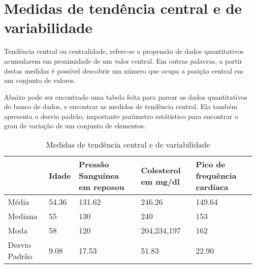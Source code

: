 \chapter{Medidas de tendência central e de variabilidade}

    Tendência central ou centralidade, refere-se a propensão de dados quantitativos acumularem
    em proximidade de um valor central. Em outras palavras, a partir destas medidas é possível 
    descobrir um número que ocupa a posição central em um conjunto de valores.

    Abaixo pode ser encontrado uma tabela feita para parear os dados quantitativos do banco de dados, 
    e encontrar as medidas de tendência central. Ela também apresenta o desvio padrão, importante 
    parâmetro estátistico para encontrar o grau de variação de um conjunto de elementos.

    \begin{table}[htb]
      \caption{Medidas de tendência central e de variabilidade}
      \centering
      \begin{tabular}{ |P{2.8cm} |P{2cm}|P{3cm}|P{3cm}|P{3cm}|  }
        \hline
          & Idade & Pressão Sanguínea em reposou & Colesterol em mg/dl & Pico de frequência cardíaca\\
        \hline
        Média & 54.36 & 131.62 & 246.26 & 149.64 \\
        \hline
        Mediana & 55 & 130 & 240 & 153 \\
        \hline
        Moda & 58 & 120 & 204,234,197 & 162 \\
        \hline
        Desvio Padrão & 9.08 & 17.53 & 51.83 & 22.90 \\
        \hline
      \end{tabular}
    \end{table}

